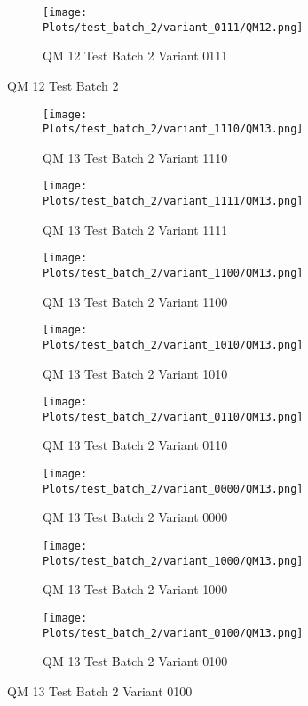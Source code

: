\documentclass{DissertateFigs}
\begin{document}
\begin{figure}[t!]
\medskip

    \begin{subfigure}{0.47\textwidth}
    \texttt{[image: Plots/test\_batch\_2/variant\_0111/QM12.png]}
    \caption{QM 12 Test Batch 2 Variant 0111}
    \end{subfigure}
\caption{QM 12 Test Batch 2}
    \end{figure}
\clearpage
\begin{figure}[t!]
    \begin{subfigure}{0.47\textwidth}
    \texttt{[image: Plots/test\_batch\_2/variant\_1110/QM13.png]}
    \caption{QM 13 Test Batch 2 Variant 1110}
    \end{subfigure}
    \begin{subfigure}{0.47\textwidth}
    \texttt{[image: Plots/test\_batch\_2/variant\_1111/QM13.png]}
    \caption{QM 13 Test Batch 2 Variant 1111}
    \end{subfigure}

\medskip

    \begin{subfigure}{0.47\textwidth}
    \texttt{[image: Plots/test\_batch\_2/variant\_1100/QM13.png]}
    \caption{QM 13 Test Batch 2 Variant 1100}
    \end{subfigure}
    \begin{subfigure}{0.47\textwidth}
    \texttt{[image: Plots/test\_batch\_2/variant\_1010/QM13.png]}
    \caption{QM 13 Test Batch 2 Variant 1010}
    \end{subfigure}

\medskip

    \begin{subfigure}{0.47\textwidth}
    \texttt{[image: Plots/test\_batch\_2/variant\_0110/QM13.png]}
    \caption{QM 13 Test Batch 2 Variant 0110}
    \end{subfigure}
    \begin{subfigure}{0.47\textwidth}
    \texttt{[image: Plots/test\_batch\_2/variant\_0000/QM13.png]}
    \caption{QM 13 Test Batch 2 Variant 0000}
    \end{subfigure}

\medskip

    \begin{subfigure}{0.47\textwidth}
    \texttt{[image: Plots/test\_batch\_2/variant\_1000/QM13.png]}
    \caption{QM 13 Test Batch 2 Variant 1000}
    \end{subfigure}
    \begin{subfigure}{0.47\textwidth}
    \texttt{[image: Plots/test\_batch\_2/variant\_0100/QM13.png]}
    \caption{QM 13 Test Batch 2 Variant 0100}
    \end{subfigure}


\end{figure}
\end{document}

